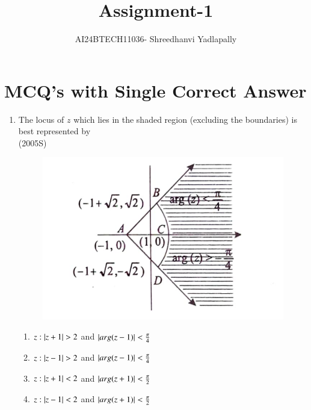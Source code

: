 \documentclass[journal,12pt,twocolumn]{IEEEtran}
\theoremstyle{remark}
\begin{document}

\vspace{3cm}

\title{Assignment-1}
\author{AI24BTECH11036- Shreedhanvi Yadlapally}
\maketitle
\newpage
\bigskip
\section{MCQ's with Single Correct Answer}
\begin{enumerate}
	\item The locus of $z$ which lies in the shaded region (excluding the boundaries) is best represented by
\\

\hfill{(2005S)}\\
		
	        \begin{figure}[ht]
\includegraphics[scale=0.2]{Figure/Screenshot_20240807-085214}
		\end{figure}
	
\begin{enumerate}
\item $z:\left\vert z+1\right\vert>2$ and  $\left\vert arg(z-1)\right\vert<\frac{\pi}{4}$
\item $z:\left\vert z-1\right\vert>2$ and $\left\vert arg(z-1)\right\vert<\frac{\pi}{4}$
\item $z:\left\vert z+1\right\vert<2$ and $\left\vert arg(z+1)\right\vert<\frac{\pi}{2}$
\item $z:\left\vert z-1\right\vert<2$ and $\left\vert arg(z+1)\right\vert<\frac{\pi}{2}$
\end{enumerate}


\end{enumerate}
\end{document}
